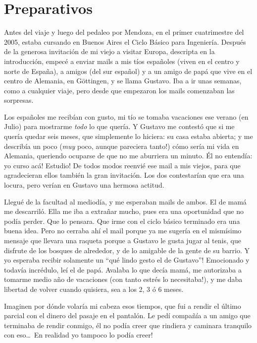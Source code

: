 \section{Preparativos}

Antes del viaje y luego del pedaleo por Mendoza, en el primer cuatrimestre del
2005, estaba cursando en Buenos Aires el Ciclo B\'asico para Ingenier\'ia.
Despu\'es de la generosa invitaci\'on de mi viejo a visitar Europa, descripta
en la introducci\'on, empec\'e a enviar mails a mis t\'ios espa\~noles (viven
en el centro y norte de Espa\~na), a amigos (del sur espa\~nol) y a un amigo
de pap\'a que vive en el centro de Alemania, en G\"ottingen, y se llama Gustavo.
Iba a ir unas semanas, como a cualquier viaje, pero desde que empezaron los
mails comenzaban las sorpresas.

Los espa\~noles me recib\'ian con gusto, mi t\'io se tomaba vacaciones ese
verano (en Julio) para mostrarme \emph{todo} lo que quer\'ia. Y Gustavo me
contest\'o que si me quer\'ia quedar seis meses, que simplemente lo hiciera:
su casa estaba abierta; y me describ\'ia un poco (\textexclamdown \emph{muy}
poco, aunque pareciera tanto!) c\'omo ser\'ia mi vida en Alemania, queriendo
ocuparse de que no me aburriera un minuto. \'El no entend\'ia: \textexclamdown
yo curso ac\'a! \textexclamdown Estudio! De todos modos reenvi\'e ese mail a
mis viejos, para que agradecieran ellos tambi\'en la gran invitaci\'on. Los
dos contestar\'ian que era una locura, pero ver\'ian en Gustavo una hermosa
actitud.

Llegu\'e de la facultad al mediod\'ia, y me esperaban mails de ambos. El de
mam\'a me descarril\'o. Ella me iba a extra\~nar mucho, pues era una
oportunidad que no pod\'ia perder. Que lo pensara. Que irme con el ciclo
b\'asico terminado era una buena idea. Pero no cerraba ah\'i el mail porque ya
me suger\'ia en el mism\'isimo mensaje que llevara una raqueta porque a Gustavo
le gusta jugar al tenis, que disfrute de los bosques de alrededor, y de lo
amigable de la gente de su barrio. \textexclamdown Y yo esperaba recibir
solamente un ``qu\'e lindo gesto el de Gustavo''! Emocionado y todav\'ia
incr\'edulo, le\'i el de pap\'a. Avalaba lo que dec\'ia mam\'a, me autorizaba a
tomarme medio a\~no de vacaciones (\textexclamdown con tanto estr\'es lo
necesitaba!), y me daba libertad de volver cuando quisiera, sea a los 2, 3 \'o 6
meses.

Imaginen por d\'onde volar\'ia mi cabeza esos tiempos, que fui a rendir el
\'ultimo parcial con el dinero del pasaje en el pantal\'on. Le ped\'i
compa\~n\'ia a un amigo que terminaba de rendir conmigo, \'el no pod\'ia creer
que rindiera y caminara tranquilo con eso\ldots\ \textexclamdown En realidad
yo tampoco lo pod\'ia creer!

